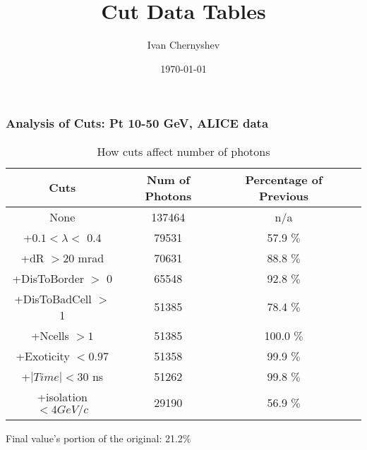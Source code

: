 \documentclass{beamer}
\title{Cut Data Tables}
\author{Ivan Chernyshev}
\date{\today}
\begin{document}
 

\frame 
{ 
\frametitle{Analysis of Cuts: Pt 10-50 GeV, ALICE data } 
\begin{table} 
\caption{How cuts affect number of photons} 
\centering 
\begin{tabular}{c c c c} 
\hline\hline 
Cuts & Num of Photons & Percentage of Previous\\ [0.5ex] 
\hline
None & 137464 & n/a\\
+$0.1 < \lambda <$ 0.4 & 79531 & 57.9 $\%$ \\
+dR $> 20$ mrad & 70631 & 88.8 $\%$ \\
+DisToBorder $>$ 0 & 65548 & 92.8 $\%$ \\
+DisToBadCell $>$ 1 & 51385 & 78.4 $\%$ \\
+Ncells $> 1$ & 51385 & 100.0 $\%$ \\
+Exoticity $< 0.97$ & 51358 & 99.9 $\%$ \\
+$|Time| < 30$ ns & 51262 & 99.8 $\%$ \\
+isolation $< 4 GeV/c$ & 29190 & 56.9 $\%$ \\
[1ex] 
\hline 
\end{tabular} 
\label{table:nonlin} 
\end{table} 
 Final value's portion of the original: 21.2\%
 } 
\end{document}
